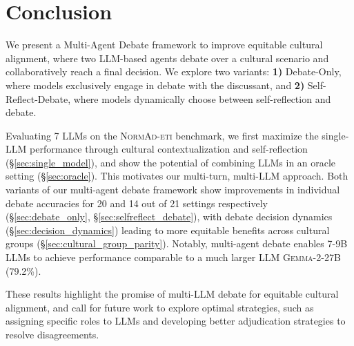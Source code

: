\section{Conclusion}


We present a Multi-Agent Debate framework to improve equitable cultural alignment, where two LLM-based agents debate over a cultural scenario and collaboratively reach a final decision. We explore two variants: \textbf{1)} Debate-Only, where models exclusively engage in debate with the discussant, and \textbf{2)} Self-Reflect-Debate, where models dynamically choose between self-reflection and debate.

Evaluating 7 LLMs on the \textsc{NormAd-eti} benchmark, we first maximize the single-LLM performance through cultural contextualization and self-reflection (\S \ref{sec:single_model}), and show the potential of combining LLMs in an oracle setting (\S \ref{sec:oracle}). %
This motivates our multi-turn, multi-LLM approach. Both variants of our multi-agent debate framework show improvements in individual debate accuracies for 20 and 14 out of 21 settings respectively (\S \ref{sec:debate_only}, \S \ref{sec:selfreflect_debate}), with debate decision dynamics  (\S \ref{sec:decision_dynamics}) leading to more equitable benefits across cultural groups (\S \ref{sec:cultural_group_parity}). %
Notably, multi-agent debate enables 7-9B LLMs to achieve performance comparable to a much larger LLM \textsc{Gemma-2-27B} (79.2\%).

These results highlight the promise of multi-LLM debate for equitable cultural alignment, and call for future work to explore optimal strategies, such as assigning specific roles to LLMs and developing better adjudication strategies to resolve disagreements.

